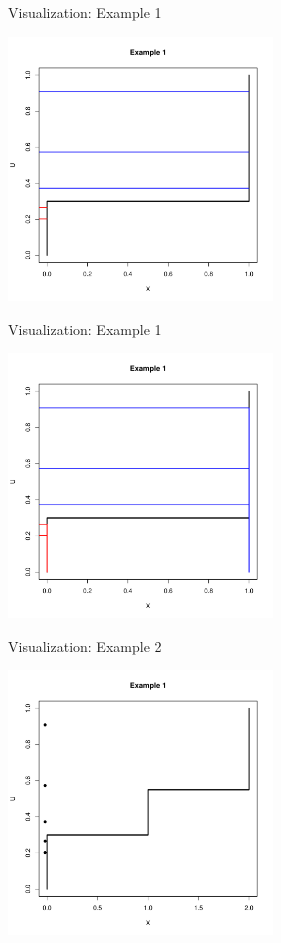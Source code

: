 \documentclass
[handout]
{beamer}
\begin{document}
\begin{frame}{Visualization: Example 1}
\begin{center}
\includegraphics[height=7cm]{./Pics/d1p2.pdf}
\end{center}
\end{frame}
\begin{frame}{Visualization: Example 1}
\begin{center}
\includegraphics[height=7cm]{./Pics/d1p3.pdf}
\end{center}
\end{frame}
\begin{frame}{Visualization: Example 2}
\begin{center}
\includegraphics[height=7cm]{./Pics/d2p1.pdf}
\end{center}
\end{frame}
\end{document}
